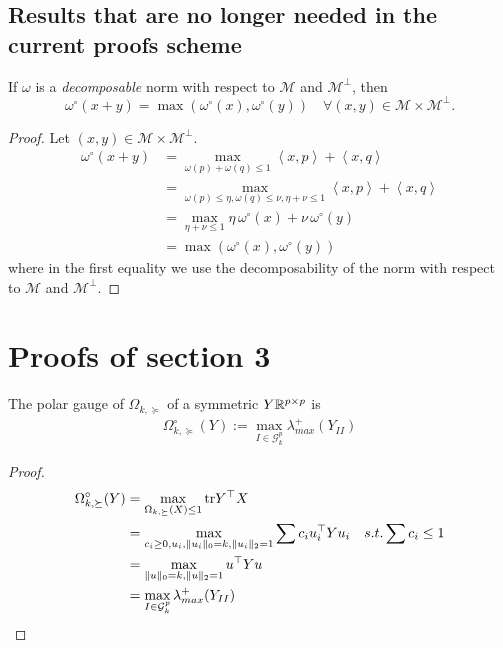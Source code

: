 \documentclass{article}
\begin{document}
\subsection{Results that are no longer needed in the current proofs scheme}
\begin{lemma}
\label{lem:dual_dec}
If $\omega$ is a \emph{decomposable} norm with respect to $\mathcal{M}$ and $\mathcal{M}^{\perp}$, then
$$
\omega^{\circ}(x+y)=\max(\omega^{\circ}(x),\omega^{\circ}(y))  \quad \forall (x,y)\in\mathcal{M}\times\mathcal{M}^{\perp}.
$$
\end{lemma}
\begin{proof}
Let $(x,y)\in\mathcal{M}\times\mathcal{M}^{\perp}$. 
\begin{align*}
\omega^{\circ}(x+y) 
&= \max_{\omega(p)+\omega(q)\leq 1} \left\langle x,p\right\rangle + \left\langle x,q\right\rangle  \\
&= \max_{\omega(p)\leq \eta, \omega(q)\leq \nu, \eta+ \nu \leq 1} \left\langle x,p\right\rangle + \left\langle x,q\right\rangle  \\
&= \max_{\eta+ \nu \leq 1} \eta\, \omega^{\circ}(x)+\nu\, \omega^{\circ}(y)\\
&= \max(\omega^{\circ}(x),\omega^{\circ}(y))
\end{align*}
where in the first equality we use the decomposability of the norm  with respect to $\mathcal{M}$ and $\mathcal{M}^{\perp}$.
\end{proof}


\newpage
\section{Proofs of section 3}

\begin{lemma} The polar gauge of $\Omega_{k,\succeq}$ of a symmetric $Y\mathbb{R}^{p\times p}$ is
\begin{align}
\Omega_{k,\succeq}^{\circ}(Y):= \max_{I\in\mathcal{G}^p_k}\lambda^{+}_{max}(Y_{II})
\end{align}
\end{lemma}

\begin{proof}
\begin{align}
\Omega_{k,\succeq}^{\circ}(Y) 
&=\max_{\Omega_{k,\succeq}(X)\leq 1} {\rm tr}{Y^{\top}X}\\
&=\max_{c_i\geq 0, u_{i}, \|u_{i}\|_0=k, \|u_{i}\|_ 2=1 } \sum c_i u_{i}^{\top}Yu_{i} \quad s.t.  \sum c_i\leq 1\\
&=\max_{\|u\|_0=k, \|u\|_ 2=1 } u^{\top}Yu \\
&=\max_{I\in\mathcal{G}^p_k}\lambda^{+}_{max}(Y_{II})
\end{align}
\end{proof}
\end{document}
